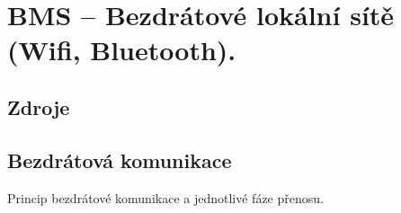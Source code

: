 

\graphicspath{{bms/bezdratove_lokalni_site/figures}}


\chapter{BMS -- Bezdrátové lokální sítě (Wifi, Bluetooth).}



\section{Zdroje}

\begin{compactitem}
    \item {}
    \item {} %
    \item {}
\end{compactitem}


\section{Bezdrátová komunikace}

\begin{compactitem}
    \item Princip bezdrátové komunikace a jednotlivé fáze přenosu.
\end{compactitem}

